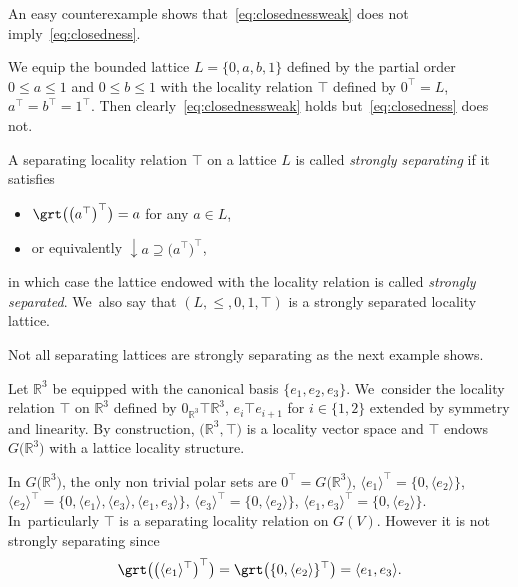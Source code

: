 \documentclass[pdftex]{sigma}
\numberwithin{equation}{section}
\newcommand{\R}{\mathbb{R}}
\newcommand{\loc}{locality\xspace}
\newcommand{\pone}{separating\xspace }
\def \ptwob {separated\xspace }
\begin{document}
An easy counterexample shows that~\eqref{eq:closednessweak} does not imply~\eqref{eq:closedness}.

\begin{coex}We equip the bounded lattice $L=\{0,a,b,1\}$ defined by the partial order $0\leq a\leq 1$ and $0\leq b\leq 1$ with the locality relation $\top$ defined by $0^\top=L$, $a^\top=b^\top=1^\top$. Then clearly~\eqref{eq:closednessweak} holds but~\eqref{eq:closedness} does not.\end{coex}
\begin{Definition}
A separating locality relation $\top$ on a lattice $L$ is called {\it strongly \pone} if it satisfies
	\begin{itemize}\itemsep=0pt	
\item [$(c)$]%
		$\grt\big(\big(a^\top\big)^\top\big)= a $ for any $a\in L$,
\item [$(c')$]%
or equivalently $\downarrow a\supseteq \big(a^\top\big)^\top $,
	\end{itemize}in which case the lattice endowed with the \loc relation is called {\it strongly \ptwob}. We~also say that $(L, \leq, 0, 1, \top) $ is a strongly separated locality lattice.
	\label{def:strongsplitlattice}
\end{Definition}
Not all separating lattices are strongly separating as the next example shows.
\begin{Example}
		Let $\R^3$ be equipped with the canonical basis $\{e_1,e_2,e_3\}$. We~consider the locality relation $\top$ on $\R^3$ defined by $0_{\R^3}\top\R^3$, $e_i\top e_{i+1}$ for $i\in \{1,2 \}$ extended by symmetry and linearity. By construction, $\big(\R^3,\top\big)$ is a locality vector space and $\top$ endows $G\big(\R^3\big)$ with a lattice locality structure.
		
In $G\big(\R^3\big)$, the only non trivial polar sets are $0^\top = G\big(\R^3\big)$,
$\langle e_1\rangle^\top = \{0,\langle e_2 \rangle\}$,
$\langle e_2\rangle^\top = \{0,\langle e_1\rangle,\langle e_3\rangle,\langle e_1, e_3\rangle\}$,
$\langle e_3\rangle^\top = \{0,\langle e_2 \rangle\}$,
$\langle e_1, e_3\rangle^\top =\{0, \langle e_2\rangle\}$. In~particularly $\top$ is a separating loca\-lity relation on $G(V)$. However it is not strongly separating since
\begin{gather*}
\grt\big(\big(\langle e_1\rangle^\top\big)^\top\big) = \grt\big(\{0, \langle e_2\rangle\}^\top\big)= \langle e_1, e_3\rangle.
\end{gather*}
\end{Example}
\end{document}
